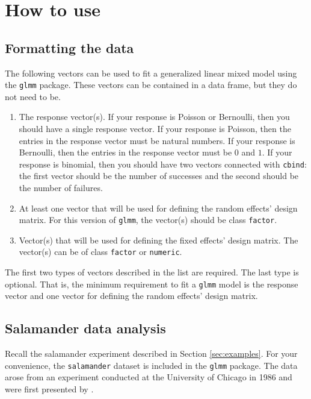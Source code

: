 \documentclass[article]{jss}
\begin{document}
\section[How to use glmm]{How to use }\label{sec:howto}


\subsection{Formatting the data}

The following vectors can be used to fit a generalized linear mixed model using the \texttt{glmm} package. These vectors can be contained in a data frame, but they do not need to be.
\begin{enumerate}
\item The response vector(s). If your response is Poisson or Bernoulli, then you should have a single response vector. If your response is Poisson, then the entries in the response vector must be natural numbers. If your response is Bernoulli, then the entries in the response vector must be $0$ and $1$. If your response is binomial, then you should have two vectors connected with \texttt{cbind}: the first vector should be the number of successes and the second should be the number of failures.
\item At least one vector that will be used for defining the random effects' design matrix. For this version of \texttt{glmm}, the vector(s) should be class \texttt{factor}.
\item Vector(s) that will be used for defining the fixed effects' design matrix. The vector(s) can be of class \texttt{factor} or \texttt{numeric}. 
\end{enumerate}
The first two types of vectors described in the list are required. The last type is optional. That is, the minimum requirement to fit a \texttt{glmm} model is the response vector and one vector for defining the random effects' design matrix. \\


\subsection{Salamander data analysis}

Recall the salamander experiment described in Section \ref{sec:examples}. For your convenience, the \texttt{salamander} dataset is  included in the \texttt{glmm} package. The data arose from an experiment conducted at the University of Chicago in 1986 and were first presented by \citet[section 14.5]{mcc:nelder:1989}.  \\
\end{document}
